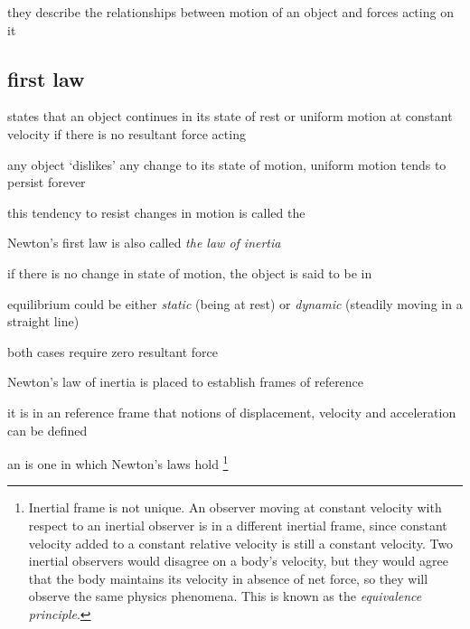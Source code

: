they describe the relationships between motion of an object and forces acting on it


\subsection{first law}

\begin{ilight}
	 states that an object continues in its state of rest or uniform motion at constant velocity if there is no resultant force acting
\end{ilight}


\cmt any object `dislikes' any change to its state of motion, uniform motion tends to persist forever

this tendency to resist changes in motion is called the 

Newton's first law is also called \emph{the law of inertia}

\cmt if there is no change in state of motion, the object is said to be in 

equilibrium could be either \emph{static} (being at rest) or \emph{dynamic} (steadily moving in a straight line)

both cases require zero resultant force

\cmt Newton’s law of inertia is placed to establish frames of reference

it is in an reference frame that notions of displacement, velocity and acceleration can be defined

an  is one in which Newton’s laws hold
\footnote{Inertial frame is not unique. An observer moving at constant velocity with respect to an inertial observer is in a different inertial frame, since constant velocity added to a constant relative velocity is still a constant velocity. Two inertial observers would disagree on a body's velocity, but they would agree that the body maintains its velocity in absence of net force, so they will observe the same physics phenomena. This is known as the \emph{equivalence principle}.}

%	


